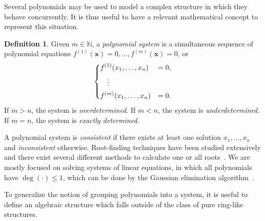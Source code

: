 \documentclass[12pt, a4paper, oneside]{memoir}
\theoremstyle{definition}
\newtheorem{definition}[theorem]{Definition}
\begin{document}
Several polynomials may be used to model a complex structure in which they behave concurrently. It is thus useful to have a relevant mathematical concept to represent this situation.

\begin{definition}\label{def:poly-sys}
  Given $m \in \mathbb{N}$, a \emph{polynomial system} is a simultaneous sequence of polynomial equations $f^{(1)}(\mathbf{x}) = 0, \dots, f^{(m)}(\mathbf{x}) = 0$, or
  \begin{align}
    \begin{dcases}
      f^{(1)}(x_{1}, \dots, x_{n}) &= 0, \\
      \quad \vdots \\
      f^{(m)}(x_{1}, \dots, x_{n}) &= 0.
    \end{dcases}
  \end{align}
  If $m > n$, the system is \emph{overdetermined}. If $m < n$, the system is \emph{underdetermined}. If $m = n$, the system is \emph{exactly determined}.
\end{definition}

A polynomial system is \emph{consistent} if there exists at least one solution $x_{1}, \dots, x_{n}$ and \emph{inconsistent} otherwise. Root-finding techniques have been studied extensively and there exist several different methods to calculate one or all roots~\cite[Chapter 9]{Press:2007}. We are mostly focused on solving systems of linear equations, in which all polynomials have $\deg(\cdot) \leq 1$, which can be done by the Gaussian elimination algorithm~\cite[Section 2.2]{Press:2007}.

To generalize the notion of grouping polynomials into a system, it is useful to define an algebraic structure which falls outside of the class of pure ring-like structures.
\end{document}
